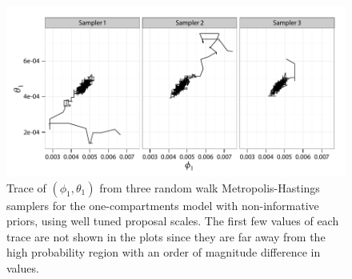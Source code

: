 \begin{figure}[t]
  \UseAltLinespread
  \includegraphics[width=\linewidth]{fig_src/PET_MH_Path.pdf}
  \caption[Traces of parameters in the random walk algorithm for the
  \protect\pet compartmental model (calibrated)]
  {Trace of $(\phi_1,\theta_1)$ from three random walk Metropolis-Hastings samplers for the one-compartments \pet model with non-informative priors, using well tuned proposal scales. The first few values of each trace are not shown in the plots since they are far away from the high probability region with an order of magnitude difference in values.}
  \label{fig:pet mh tuned}
\end{figure}
